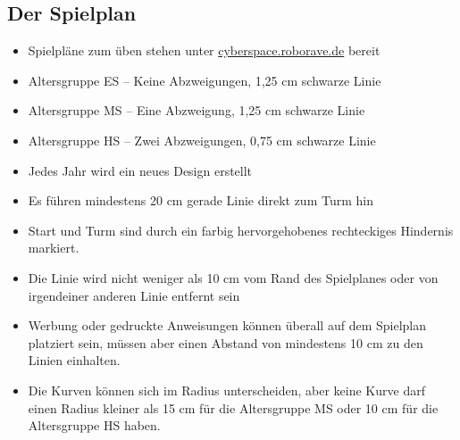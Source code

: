 \documentclass[a4paper,12pt]{article}
\begin{document}
\subsection{Der Spielplan}

\begin{itemize}
	\item Spielpläne zum üben stehen unter
\href{https://www.cyberspace.roborave.de/lab/}{cyberspace.roborave.de} bereit
	\item Altersgruppe ES – Keine Abzweigungen, 1,25 cm schwarze Linie
	\item Altersgruppe MS – Eine Abzweigung, 1,25 cm schwarze Linie
	\item Altersgruppe HS – Zwei Abzweigungen, 0,75 cm schwarze Linie
	\item Jedes Jahr wird ein neues Design erstellt
	\item Es führen mindestens 20 cm gerade Linie direkt zum Turm hin
	\item Start und Turm sind durch ein farbig hervorgehobenes rechteckiges
		 Hindernis markiert.
	\item Die Linie wird nicht weniger als 10 cm vom Rand des Spielplanes
		oder von irgendeiner anderen Linie entfernt sein
	\item Werbung oder gedruckte Anweisungen können überall auf dem
		Spielplan platziert sein, müssen aber einen Abstand von
		mindestens 10 cm zu den Linien einhalten.
	\item Die Kurven können sich im Radius unterscheiden, aber keine Kurve
darf einen Radius kleiner als 15 cm für die Altersgruppe MS oder 10 cm für die
Altersgruppe HS haben.
\end{itemize}
\end{document}
